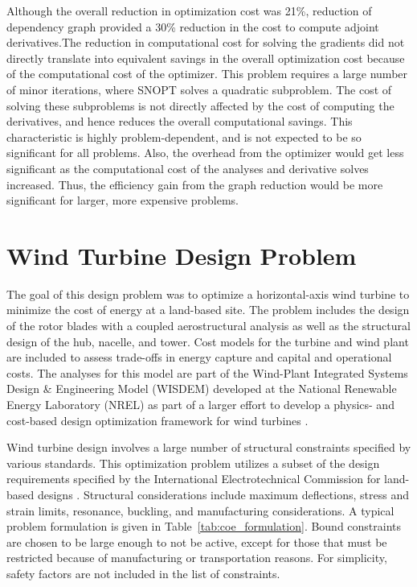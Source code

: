 \documentclass[]{aiaa-tc} %
\begin{document}
            Although the overall reduction in optimization cost was 21\%, reduction of dependency graph provided
            a 30\% reduction in the cost to compute adjoint derivatives.The reduction in computational cost for solving the gradients 
            did not directly translate into equivalent savings in the overall optimization cost because of the computational 
            cost of the optimizer. This problem requires a large number of minor iterations, where SNOPT solves a quadratic subproblem.
            The cost of solving these subproblems is not directly affected by the cost of computing the derivatives, and hence
            reduces the overall computational savings. This characteristic is highly problem-dependent, and is not expected
            to be so significant for all problems. Also, the overhead from the optimizer would get less significant as the
            computational cost of the analyses and derivative solves increased. Thus, the efficiency gain from the graph reduction
            would be more significant for larger, more expensive problems.


  \section{Wind Turbine Design Problem}

    The goal of this design problem was to optimize a horizontal-axis wind turbine to minimize
    the cost of energy at a land-based site. The problem includes the design of the rotor blades
    with a coupled aerostructural analysis as well as the structural design of the hub, nacelle,
    and tower. Cost models for the turbine and wind plant are included
    to assess trade-offs in energy capture and capital and operational costs. The analyses
    for this model are part of the Wind-Plant Integrated Systems Design \& Engineering Model (WISDEM)
    developed at the National Renewable Energy Laboratory (NREL) as part of a larger effort
    to develop a physics- and cost-based design optimization framework for wind turbines  \cite{Dykes2014a,Ning2013a,Ning2014,Ning2014d}.

    Wind turbine design involves a large number of structural constraints specified by various standards.  This optimization problem utilizes a subset of the design requirements specified by the International Electrotechnical Commission for land-based designs \cite{IEC}.  Structural considerations include maximum deflections, stress and strain limits, resonance, buckling, and manufacturing considerations.   A typical problem formulation is given in Table~\ref{tab:coe_formulation}.  Bound constraints are chosen to be large enough to not be active, except for those that must be restricted because of manufacturing or transportation reasons.  For simplicity, safety factors are not included in the list of constraints.
\end{document}
